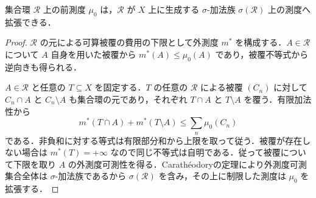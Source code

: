 \begin{prop}[前測度の拡張定理]
集合環 $\mathcal R$ 上の前測度 $\mu_0$ は，$\mathcal R$ が $X$ 上に生成する $\sigma$-加法族 $\sigma(\mathcal R)$ 上の測度へ拡張できる．
\end{prop}
\begin{proof}
$\mathcal R$ の元による可算被覆の費用の下限として外測度 $m^*$ を構成する．$A\in\mathcal R$ について $A$ 自身を用いた被覆から $m^*(A)\leq\mu_0(A)$ であり，被覆不等式から逆向きも得られる．

$A\in\mathcal R$ と任意の $T\subseteq X$ を固定する．$T$ の任意の $\mathcal R$ による被覆 $(C_n)$ に対して $C_n\cap A$ と $C_n\setminus A$ も集合環の元であり，それぞれ $T\cap A$ と $T\setminus A$ を覆う．有限加法性から
\[
 m^*(T\cap A)+m^*(T\setminus A)
 \leq\sum_n\mu_0(C_n)
\]
である．非負和に対する等式は有限部分和から上限を取って従う．被覆が存在しない場合は $m^*(T)=+\infty$ なので同じ不等式は自明である．従って被覆について下限を取り $A$ の外測度可測性を得る．Carathéodoryの定理により外測度可測集合全体は $\sigma$-加法族であるから $\sigma(\mathcal R)$ を含み，その上に制限した測度は $\mu_0$ を拡張する．
\end{proof}
